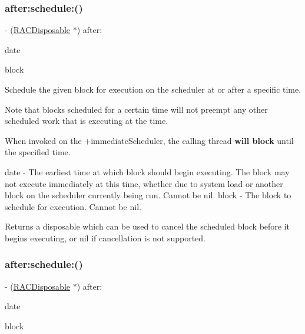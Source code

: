\subsubsection{\texorpdfstring{after\+:schedule\+:()}{after:schedule:()}\hspace{0.1cm}{\footnotesize\ttfamily [1/3]}}
{\footnotesize\ttfamily -\/ (\mbox{\hyperlink{interface_r_a_c_disposable}{R\+A\+C\+Disposable}} $\ast$) after\+: \begin{DoxyParamCaption}\item[{(N\+S\+Date $\ast$)}]{date }\item[{schedule:(void($^\wedge$)(void))}]{block }\end{DoxyParamCaption}}

Schedule the given block for execution on the scheduler at or after a specific time.

Note that blocks scheduled for a certain time will not preempt any other scheduled work that is executing at the time.

When invoked on the +immediate\+Scheduler, the calling thread {\bfseries will block} until the specified time.

date -\/ The earliest time at which {\ttfamily block} should begin executing. The block may not execute immediately at this time, whether due to system load or another block on the scheduler currently being run. Cannot be nil. block -\/ The block to schedule for execution. Cannot be nil.

Returns a disposable which can be used to cancel the scheduled block before it begins executing, or nil if cancellation is not supported. \mbox{\label{interface_r_a_c_scheduler_ada2a84ec6cf8eed043bcef654334c601}} 
\subsubsection{\texorpdfstring{after\+:schedule\+:()}{after:schedule:()}\hspace{0.1cm}{\footnotesize\ttfamily [2/3]}}
{\footnotesize\ttfamily -\/ (\mbox{\hyperlink{interface_r_a_c_disposable}{R\+A\+C\+Disposable}} $\ast$) after\+: \begin{DoxyParamCaption}\item[{(N\+S\+Date $\ast$)}]{date }\item[{schedule:(void($^\wedge$)(void))}]{block }\end{DoxyParamCaption}}

